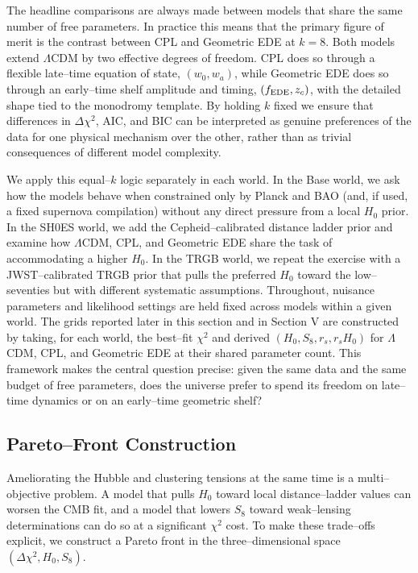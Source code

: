 \documentclass[a4paper,11pt]{article}
\begin{document}
The headline comparisons are always made between models that share the same number of free parameters. In practice this means that the primary figure of merit is the contrast between CPL and Geometric EDE at $k = 8$. Both models extend $\Lambda$CDM by two effective degrees of freedom. CPL does so through a flexible late--time equation of state, $(w_0, w_a)$, while Geometric EDE does so through an early--time shelf amplitude and timing, $(f_{\rm EDE}, z_c)$, with the detailed shape tied to the monodromy template. By holding $k$ fixed we ensure that differences in $\Delta\chi^2$, AIC, and BIC can be interpreted as genuine preferences of the data for one physical mechanism over the other, rather than as trivial consequences of different model complexity.

We apply this equal--$k$ logic separately in each world. In the Base world, we ask how the models behave when constrained only by Planck and BAO (and, if used, a fixed supernova compilation) without any direct pressure from a local $H_0$ prior. In the SH0ES world, we add the Cepheid--calibrated distance ladder prior and examine how $\Lambda$CDM, CPL, and Geometric EDE share the task of accommodating a higher $H_0$. In the TRGB world, we repeat the exercise with a JWST--calibrated TRGB prior that pulls the preferred $H_0$ toward the low--seventies but with different systematic assumptions. Throughout, nuisance parameters and likelihood settings are held fixed across models within a given world. The grids reported later in this section and in Section V are constructed by taking, for each world, the best--fit $\chi^2$ and derived $(H_0, S_8, r_s, r_s H_0)$ for $\Lambda$CDM, CPL, and Geometric EDE at their shared parameter count. This framework makes the central question precise: given the same data and the same budget of free parameters, does the universe prefer to spend its freedom on late--time dynamics or on an early--time geometric shelf?


\subsection{Pareto--Front Construction}
\label{sec:pareto}

Ameliorating the Hubble and clustering tensions at the same time is a multi--objective problem. A model that pulls $H_0$ toward local distance--ladder values can worsen the CMB fit, and a model that lowers $S_8$ toward weak--lensing determinations can do so at a significant $\chi^2$ cost. To make these trade--offs explicit, we construct a Pareto front in the three--dimensional space $(\Delta\chi^2, H_0, S_8)$.
\end{document}
